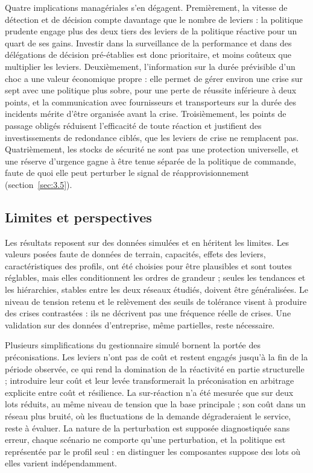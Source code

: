Quatre implications managériales s'en dégagent. Premièrement, la vitesse de détection et de décision compte davantage que le nombre de leviers : la politique prudente engage plus des deux tiers des leviers de la politique réactive pour un quart de ses gains. Investir dans la surveillance de la performance et dans des délégations de décision pré-établies est donc prioritaire, et moins coûteux que multiplier les leviers. Deuxièmement, l'information sur la durée prévisible d'un choc a une valeur économique propre : elle permet de gérer environ une crise sur sept avec une politique plus sobre, pour une perte de réussite inférieure à deux points, et la communication avec fournisseurs et transporteurs sur la durée des incidents mérite d'être organisée avant la crise. Troisièmement, les points de passage obligés réduisent l'efficacité de toute réaction et justifient des investissements de redondance ciblés, que les leviers de crise ne remplacent pas. Quatrièmement, les stocks de sécurité ne sont pas une protection universelle, et une réserve d'urgence gagne à être tenue séparée de la politique de commande, faute de quoi elle peut perturber le signal de réapprovisionnement (section~\ref{sec:3.5}).

\subsection{Limites et perspectives}
\label{sec:7.3}

Les résultats reposent sur des données simulées et en héritent les limites. Les valeurs posées faute de données de terrain, capacités, effets des leviers, caractéristiques des profils, ont été choisies pour être plausibles et sont toutes réglables, mais elles conditionnent les ordres de grandeur ; seules les tendances et les hiérarchies, stables entre les deux réseaux étudiés, doivent être généralisées. Le niveau de tension retenu et le relèvement des seuils de tolérance visent à produire des crises contrastées : ils ne décrivent pas une fréquence réelle de crises. Une validation sur des données d'entreprise, même partielles, reste nécessaire.

Plusieurs simplifications du gestionnaire simulé bornent la portée des préconisations. Les leviers n'ont pas de coût et restent engagés jusqu'à la fin de la période observée, ce qui rend la domination de la réactivité en partie structurelle ; introduire leur coût et leur levée transformerait la préconisation en arbitrage explicite entre coût et résilience. La sur-réaction n'a été mesurée que sur deux lots réduits, au même niveau de tension que la base principale ; son coût dans un réseau plus bruité, où les fluctuations de la demande dégraderaient le service, reste à évaluer. La nature de la perturbation est supposée diagnostiquée sans erreur, chaque scénario ne comporte qu'une perturbation, et la politique est représentée par le profil seul : en distinguer les composantes suppose des lots où elles varient indépendamment.

